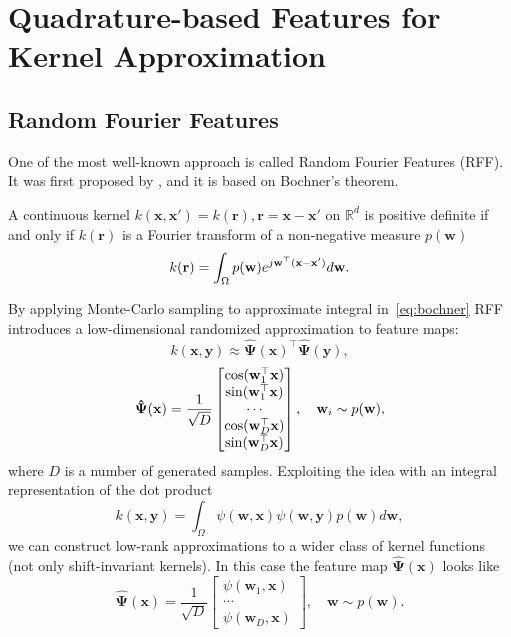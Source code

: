 \section{Quadrature-based Features for Kernel Approximation}

\subsection{Random Fourier Features}
\label{sec:random_fourier_features}
One of the most well-known approach is called
Random Fourier Features (RFF).
It was first proposed by \citep{rahimi2008random}, and it is based on Bochner's theorem.
\begin{theorem}[Bochner]
    A continuous kernel $k(\mathbf{x, x'}) = k(\mathbf{r}), \mathbf{r = x - x'}$ on
    $\mathbb{R}^d$ is positive definite if and only if
    $k(\mathbf{r})$ is a Fourier transform of a non-negative measure $p(\mathbf{w})$
    \begin{equation}
    \label{eq:bochner}
        k(\mathbf{r}) = \int_{\Omega} p(\mathbf{w}) e^{j\mathbf{w^{\top}(x - x')}} d\mathbf{w}.
    \end{equation}
\end{theorem}
By applying Monte-Carlo sampling to approximate integral in~\eqref{eq:bochner}
RFF introduces a low-dimensional randomized approximation to feature maps:
\begin{equation}
\label{eq:inner}
    k(\mathbf{x, y}) \approx
    \mathbf{\hat{\Psi}}(\mathbf{x})^{\boldsymbol{\top}} \mathbf{\hat{\Psi}}(\mathbf{y}),
\end{equation}
\[
    \mathbf{\hat{\Psi}}(\mathbf{x}) =
    \frac{1}{\sqrt{D}} \begin{bmatrix}
        \cos(\mathbf{w}_1^\top\mathbf{x}) \\
        \sin(\mathbf{w}_1^\top \mathbf{x}) \\
        \cdots \\
        \cos(\mathbf{w}_D^\top \mathbf{x}) \\
        \sin(\mathbf{w}_D^\top \mathbf{x}) \\
    \end{bmatrix}, \quad \mathbf{w}_i \sim p(\mathbf{w}),
\]
where $D$ is a number of generated samples.
Exploiting the idea with an integral representation of the dot product
\[
k(\mathbf{x, y}) = \int_{\Omega} \psi(\mathbf{w, x}) \psi(\mathbf{w, y}) p(\mathbf{w}) d\mathbf{w},
\]
we can construct low-rank approximations to a wider class of kernel functions
(not only shift-invariant kernels).
In this case the feature map $\mathbf{\hat{\Psi}}(\mathbf{x})$ looks like
\[
    \mathbf{\hat{\Psi}}(\mathbf{x}) = \frac{1}{\sqrt{D}} \begin{bmatrix}
        \psi(\mathbf{w}_1, \mathbf{x}) \\
        \cdots \\
        \psi(\mathbf{w}_D, \mathbf{x})
    \end{bmatrix},
    \quad
    \mathbf{w} \sim p(\mathbf{w}).
\]









